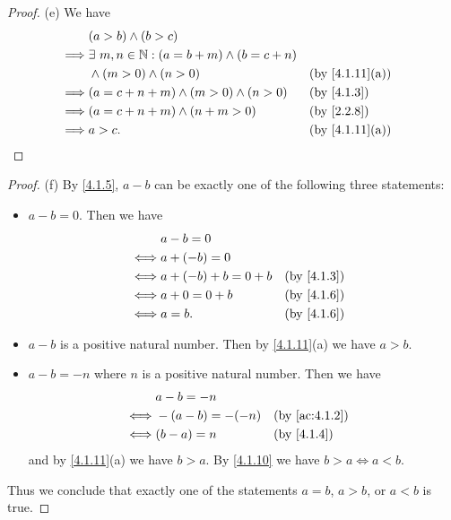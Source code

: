\begin{proof}{(e)}
  We have
  \begin{align*}
             & (a > b) \land (b > c)                                                                  \\
    \implies & \exists\ m, n \in \N : (a = b + m) \land (b = c + n)                                   \\
             & \land (m > 0) \land (n > 0)                          &  & \text{(by \cref{4.1.11}(a))} \\
    \implies & (a = c + n + m) \land (m > 0) \land (n > 0)          &  & \text{(by \cref{4.1.3})}     \\
    \implies & (a = c + n + m) \land (n + m > 0)                    &  & \text{(by \cref{2.2.8})}     \\
    \implies & a > c.                                               &  & \text{(by \cref{4.1.11}(a))}
  \end{align*}
\end{proof}

\begin{proof}{(f)}
  By \cref{4.1.5}, \(a - b\) can be exactly one of the following three statements:
  \begin{itemize}
    \item \(a - b = 0\).
          Then we have
          \begin{align*}
                 & a - b = 0                                          \\
            \iff & a + (-b) = 0                                       \\
            \iff & a + (-b) + b = 0 + b &  & \text{(by \cref{4.1.3})} \\
            \iff & a + 0 = 0 + b        &  & \text{(by \cref{4.1.6})} \\
            \iff & a = b.               &  & \text{(by \cref{4.1.6})}
          \end{align*}
    \item \(a - b\) is a positive natural number.
          Then by \cref{4.1.11}(a) we have \(a > b\).
    \item \(a - b = -n\) where \(n\) is a positive natural number.
          Then we have
          \begin{align*}
                 & a - b = -n                                        \\
            \iff & -(a - b) = -(-n) &  & \text{(by \cref{ac:4.1.2})} \\
            \iff & (b - a) = n      &  & \text{(by \cref{4.1.4})}
          \end{align*}
          and by \cref{4.1.11}(a) we have \(b > a\).
          By \cref{4.1.10} we have \(b > a \iff a < b\).
  \end{itemize}
  Thus we conclude that exactly one of the statements \(a = b\), \(a > b\), or \(a < b\) is true.
\end{proof}

